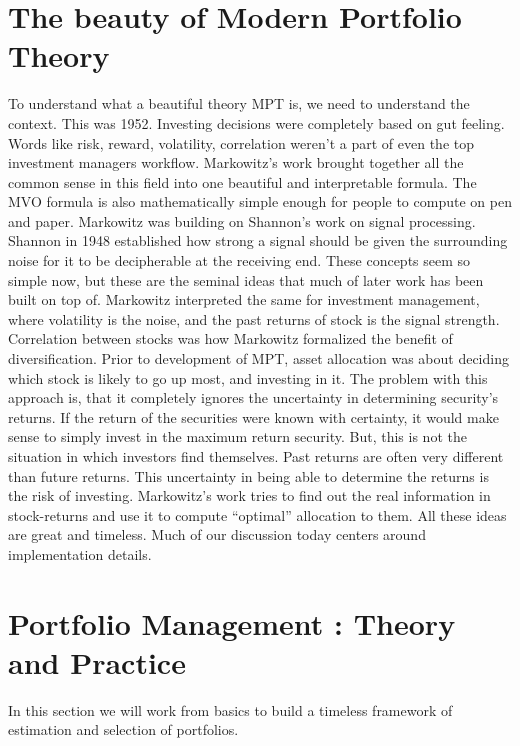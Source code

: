 \documentclass[a4paper]{article}
\begin{document}
\section{The beauty of Modern Portfolio Theory \label{salient features}} 
To understand what a beautiful theory MPT is, we need to understand the context. This was 1952. Investing decisions were completely based on gut feeling. Words like risk, reward, volatility, correlation weren’t a part of even the top investment managers workflow. Markowitz’s work brought together all the common sense in this field into one beautiful and interpretable formula. The MVO formula is also mathematically simple enough for people to compute on pen and paper. 
Markowitz was building on Shannon’s work on signal processing. Shannon in 1948 established how strong a signal should be given the surrounding noise for it to be decipherable at the receiving end. These concepts seem so simple now, but these are the seminal ideas that much of later work has been built on top of. Markowitz interpreted the same for investment management, where volatility is the noise, and the past returns of stock is the signal strength. Correlation between stocks was how Markowitz formalized the benefit of diversification. 
Prior to development of MPT, asset allocation was about deciding which stock is likely to go up most, and investing in it. The problem with this approach is, that it completely ignores the uncertainty in determining security’s returns. If the return of the securities were known with certainty, it would make sense to simply invest in the maximum return security. But, this is not the situation in which investors find themselves. Past returns are often very different than future returns. This uncertainty in being able to determine the returns is the risk of investing. Markowitz’s work tries to find out the real information in stock-returns and use it to compute “optimal” allocation to them.
All these ideas are great and timeless. Much of our discussion today centers around implementation details. 
\section{Portfolio Management : Theory and Practice \label{portfolio-management-principles}}
In this section we will work from basics to build a timeless framework of estimation and selection of portfolios.
\end{document}

